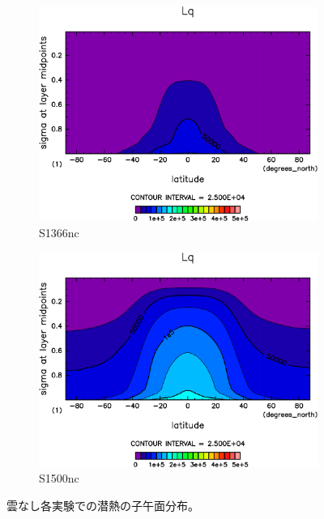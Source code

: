 \documentclass[body]{subfiles}
\begin{document}
\begin{figure}[t]
	\centering
	\begin{subfigure}{.4\textwidth}
		\centering
		\includegraphics[width=\columnwidth]{S1366-nc/Lq,time=3650:4015-crop-rotate.pdf}
		\caption{S1366nc}\label{LqS1366nc}
	\end{subfigure}
	\begin{subfigure}{.4\textwidth}
		\centering
		\includegraphics[width=\columnwidth]{S1500-nc/Lq,time=3650:4015-crop-rotate.pdf}
		\caption{S1500nc}\label{LqS1500nc}
	\end{subfigure}
	\caption[雲なし各実験での潜熱の子午面分布]{
		雲なし各実験での潜熱の子午面分布。
	}\label{Lqnc}
\end{figure}
\end{document}
